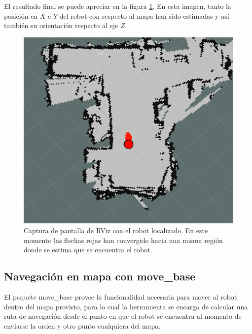 El resultado final se puede apreciar en la figura \ref{fig:robotLocalizado}. En esta imagen, tanto la posición en $X$ e $Y$ del robot con respecto al mapa han sido estimadas y así también su orientación respecto al eje $Z$.

\begin{figure}[ht]
    \centering
    \includegraphics[scale=0.4]{./Figures/robot_localizado.png}
    \caption{Captura de pantalla de RViz con el robot localizado. En este momento las flechas rojas han convergido hacia una misma región donde se estima que se encuentra el robot.}
    \label{fig:robotLocalizado}
\end{figure}

\subsection{Navegación en mapa con move\_base}

El paquete move\_base provee la funcionalidad necesaria para mover al robot dentro del mapa provisto, para lo cual la herramienta se encarga de calcular una ruta de navegación desde el punto en que el robot se encuentra al momento de enviarse la orden y otro punto cualquiera del mapa.

